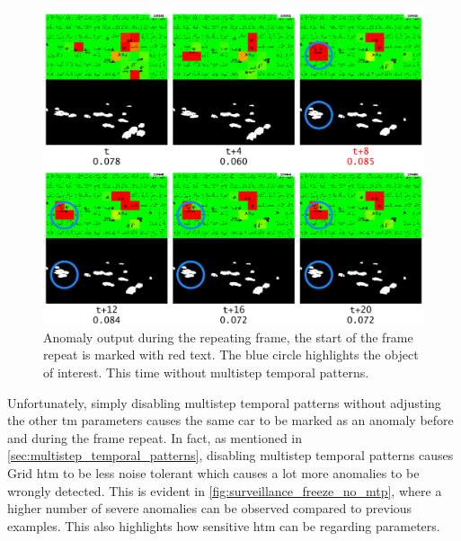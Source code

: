\begin{figure}[H]
    \centering
    \includegraphics[width=\textwidth]{resources/experiments/surveillance/surveillance_freeze_no_mtp.png}
    \caption[Frame Repeat No Multistep Temporal Pattern Anomaly]{Anomaly output during the repeating frame, the start of the frame repeat is marked with red text. The blue circle highlights the object of interest. This time without multistep temporal patterns.}
    \label{fig:surveillance_freeze_no_mtp}
\end{figure}
Unfortunately, simply disabling multistep temporal patterns without adjusting the other \gls*{tm} parameters causes the same car to be marked as an anomaly before and during the frame repeat. In fact, as mentioned in \autoref{sec:multistep_temporal_patterns}, disabling multistep temporal patterns causes Grid \gls*{htm} to be less noise tolerant which causes a lot more anomalies to be wrongly detected. This is evident in \autoref{fig:surveillance_freeze_no_mtp}, where a higher number of severe anomalies can be observed compared to previous examples. This also highlights how sensitive \gls*{htm} can be regarding parameters.
